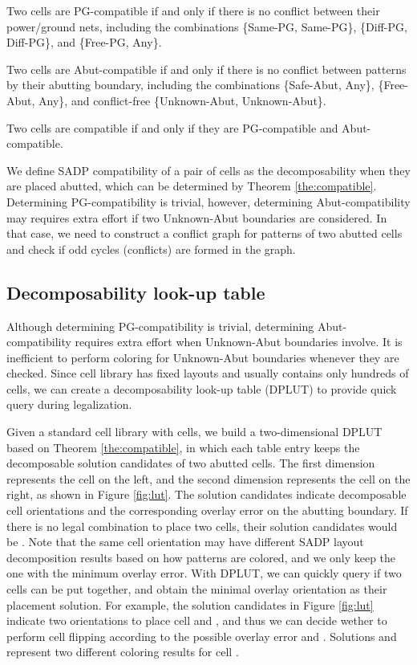 \begin{mylemma}
Two cells are PG-compatible if and only if there is no conflict between their power/ground nets, including the combinations \{Same-PG, Same-PG\}, \{Diff-PG, Diff-PG\}, and \{Free-PG, Any\}.
\end{mylemma} 

\begin{mylemma}
Two cells are Abut-compatible if and only if there is no conflict between patterns by their abutting boundary, including the combinations \{Safe-Abut, Any\}, \{Free-Abut, Any\}, and conflict-free \{Unknown-Abut, Unknown-Abut\}.
\end{mylemma} 

\begin{mytheorem} \label{the:compatible}
Two cells are compatible if and only if they are PG-compatible and Abut-compatible.
\end{mytheorem} 

We define SADP compatibility of a pair of cells as the decomposability when they are placed abutted, which can be determined by Theorem \ref{the:compatible}. Determining PG-compatibility is trivial, however, determining Abut-compatibility may requires extra effort if two Unknown-Abut boundaries are considered. In that case, we need to construct a conflict graph for patterns of two abutted cells and check if odd cycles (conflicts) are formed in the graph.

\subsection{Decomposability look-up table} \label{sec:dplut}
Although determining PG-compatibility is trivial, determining Abut-compatibility requires extra effort when Unknown-Abut boundaries involve. It is inefficient to perform coloring for Unknown-Abut boundaries whenever they are checked. Since cell library has fixed layouts and usually contains only hundreds of cells, we can create a decomposability look-up table (DPLUT) to provide quick query during legalization.

Given a standard cell library with  cells, we build a two-dimensional  DPLUT based on Theorem \ref{the:compatible}, in which each table entry keeps the decomposable solution candidates of two abutted cells. The first dimension represents the cell on the left, and the second dimension represents the cell on the right, as shown in Figure \ref{fig:lut}. The solution candidates indicate decomposable cell orientations and the corresponding overlay error on the abutting boundary. If there is no legal combination to place two cells, their solution candidates would be . Note that the same cell orientation may have different SADP layout decomposition results based on how patterns are colored, and we only keep the one with the minimum overlay error. With DPLUT, we can quickly query if two cells can be put together, and obtain the minimal overlay orientation as their placement solution. For example, the solution candidates in Figure \ref{fig:lut} indicate two orientations to place cell  and , and thus we can decide wether to perform cell flipping according to the possible overlay error  and . Solutions  and  represent two different coloring results for cell .

